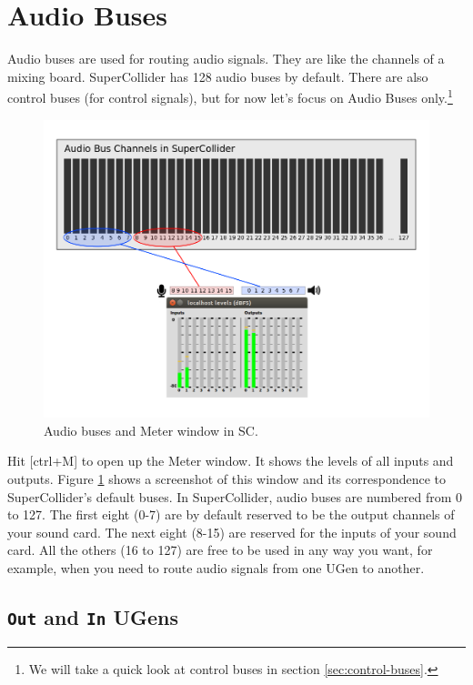 \section{Audio Buses}
\label{sec:audiobus}

Audio buses are used for routing audio signals. They are like the channels of a mixing board. SuperCollider has 128 audio buses by default. There are also control buses (for control signals), but for now let's focus on Audio Buses only.\footnote{We will take a quick look at control buses in section \ref{sec:control-buses}.}

\begin{figure}[h!]
\centerline{
	\includegraphics[scale=0.4]{fig-audio-bus.png}}
\caption{Audio buses and Meter window in SC.}
\label{fig:audio-bus}
\end{figure}

Hit [ctrl+M] to open up the Meter window. It shows the levels of all inputs and outputs. Figure \ref{fig:audio-bus} shows a screenshot of this window and its correspondence to SuperCollider's default buses. In SuperCollider, audio buses are numbered from 0 to 127. The first eight (0-7) are by default reserved to be the output channels of your sound card. The next eight (8-15) are reserved for the inputs of your sound card. All the others (16 to 127) are free to be used in any way you want, for example, when you need to route audio signals from one UGen to another.

\subsection{\texttt{Out} and \texttt{In} UGens}


